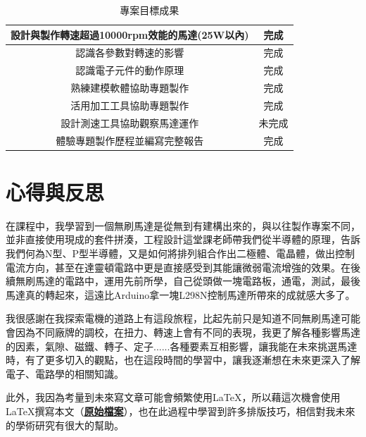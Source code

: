 \documentclass[12pt,a4paper]{article}
\begin{document}
\begin{CJK*}{UTF8}{bkai}
\begin{table}[H]
\begin{tabular}{|c|c|}
            \hline
            設計與製作轉速超過10000rpm效能的馬達(25W以內) & 完成  \\
            \hline
            認識各參數對轉速的影響                   & 完成  \\
            \hline
            認識電子元件的動作原理                   & 完成  \\
            \hline
            熟練建模軟體協助專題製作                  & 完成  \\
            \hline
            活用加工工具協助專題製作                  & 完成  \\
            \hline
            設計測速工具協助觀察馬達運作                & 未完成 \\
            \hline
            體驗專題製作歷程並編寫完整報告               & 完成  \\
            \hline
        \end{tabular}
        \caption{專案目標成果}
    \end{table}
    \renewcommand{\arraystretch}{1}
    \newpage
    \section{心得與反思}
    在課程中，我學習到一個無刷馬達是從無到有建構出來的，與以往製作專案不同，並非直接使用現成的套件拼湊，工程設計這堂課老師帶我們從半導體的原理，告訴我們何為N型、P型半導體，又是如何將排列組合作出二極體、電晶體，做出控制電流方向，甚至在達靈頓電路中更是直接感受到其能讓微弱電流增強的效果。在後續無刷馬達的電路中，運用先前所學，自己從頭做一塊電路板，通電，測試，最後馬達真的轉起來，這遠比Arduino拿一塊L298N控制馬達所帶來的成就感大多了。

    我很感謝在我探索電機的道路上有這段旅程，比起先前只是知道不同無刷馬達可能會因為不同廠牌的調校，在扭力、轉速上會有不同的表現，我更了解各種影響馬達的因素，氣隙、磁鐵、轉子、定子......各種要素互相影響，讓我能在未來挑選馬達時，有了更多切入的觀點，也在這段時間的學習中，讓我逐漸想在未來更深入了解電子、電路學的相關知識。

    此外，我因為考量到未來寫文章可能會頻繁使用\LaTeX，所以藉這次機會使用\LaTeX 撰寫本文（\href{https://github.com/moon-jam/engineering_design_learning_portfolio}{\bf{原始檔案}}），也在此過程中學習到許多排版技巧，相信對我未來的學術研究有很大的幫助。

    \newpage
    \nocite{*}
    
    

\end{CJK*}
\end{document}
